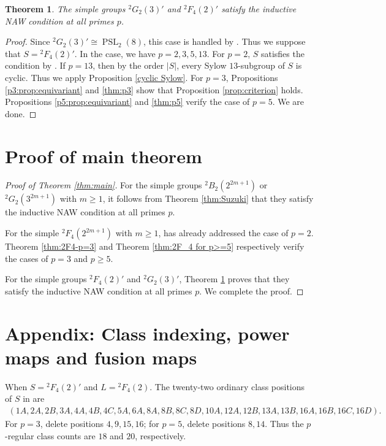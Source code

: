 \documentclass[11pt,a4paper]{article}
\numberwithin{equation}{section}
\newtheorem{theorem}{Theorem}[section]
\theoremstyle{definition}
\theoremstyle{remark}
\begin{document}
\begin{theorem}\label{thm: all p}
The simple groups ${}^2G_2(3)'$ and ${}^2F_4(2)'$ satisfy the inductive NAW condition at all primes $p$.
\end{theorem}
\begin{proof}
Since ${}^2G_2(3)'\cong\operatorname{PSL}_2(8)$, this case is handled by \cite[Proposition 10.8]{FFZ}. Thus we suppose that $S={}^2F_4(2)'$. In the case, we have $p=2,3,5,13$. For $p=2$, $S$ satisfies the condition by \cite[Proposition 9.3]{FFZ}. If $p=13$, then by the order $|S|$, every Sylow $13$-subgroup of $S$ is cyclic. Thus we apply Proposition \ref{cyclic Sylow}. 
For $p=3$, Propositions \ref{p3:prop:equivariant} and \ref{thm:p3} show that Proposition \ref{prop:criterion} holds.  Propositions \ref{p5:prop:equivariant} and \ref{thm:p5} verify the case of $p=5$. We are done.
\end{proof}

\section{Proof of main theorem}\label{section 5}
\begin{proof}[Proof of Theorem \ref{thm:main}]
For the simple groups ${}^2B_2(2^{2m+1})$ or ${}^2G_2(3^{2m+1})$ with $m\geq1$, it follows from
Theorem \ref{thm:Suzuki} that they satisfy the inductive NAW condition at all primes $p$. 

For the simple ${}^2F_4(2^{2m+1})$ with $m\geq 1$, \cite[Theorem C]{FFZ} has already addressed  the case of $p=2$. Theorem \ref{thm:2F4-p=3} and Theorem \ref{thm:2F_4 for p>=5} respectively verify the cases of $p=3$ and $p\geq 5$.  

For the simple groups ${}^2F_4(2)'$ and ${}^2G_2(3)'$, Theorem \ref{thm: all p} proves that they satisfy the inductive NAW condition at all primes $p$. We complete the proof.
\end{proof}

\appendix
\section{Appendix: Class indexing, power maps and fusion maps}\label{app:maps}
When \(S={}^2F_4(2)'\) and \(L={}^2F_4(2)\). The twenty-two ordinary  class positions of \(S\) in \cite{OrdData} are
\[
\begin{gathered}
(1A,2A,2B,3A,4A,4B,4C,5A,6A,8A,8B,8C,8D,
10A,12A,12B,13A,13B,16A,16B,16C,16D).
\end{gathered}
\]
For \(p=3\), delete positions \(4,9,15,16\); for \(p=5\), delete positions \(8,14\). Thus the $p$-regular class counts are \(18\) and \(20\), respectively.
\end{document}
